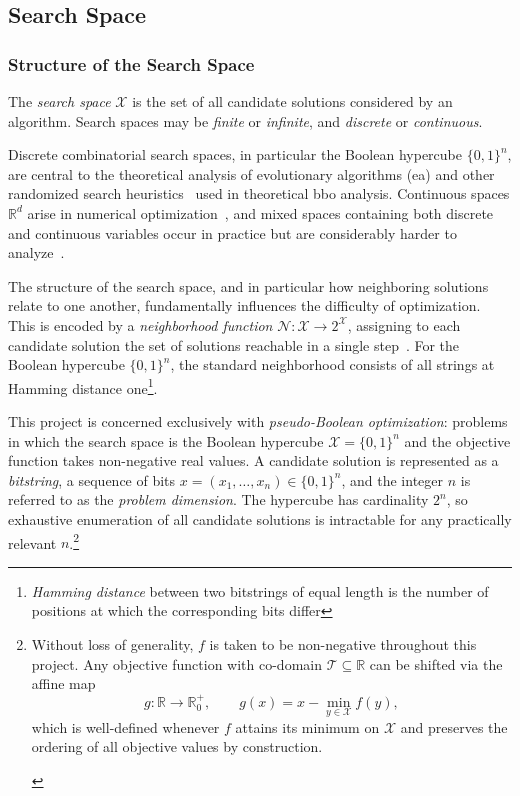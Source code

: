 \subsection{Search Space}
\subsubsection{Structure of the Search Space}

The \textit{search space} $\mathcal{X}$ is the set of all candidate
solutions considered
by an algorithm. Search spaces may be \textit{finite} or \textit{infinite}, and
\textit{discrete} or \textit{continuous}.

Discrete combinatorial search spaces, in particular the Boolean
hypercube $\{0,1\}^n$, are central to the theoretical analysis of
evolutionary algorithms (\acrshort{ea}) and other randomized search
heuristics~\cite{droste2002analysis,hoos2005sls} used in theoretical
\acrshort{bbo} analysis.
Continuous spaces $\mathbb{R}^d$ arise in numerical
optimization~\cite{nocedal2006numerical}, and mixed spaces containing
both discrete and continuous variables occur in practice but are
considerably harder to
analyze~\cite{audet2017derivative}.

The structure of the search space, and in particular how neighboring
solutions relate to
one another, fundamentally influences the difficulty of optimization.
This is encoded by
a \textit{neighborhood function} $\mathcal{N} : \mathcal{X} \to
2^{\mathcal{X}}$,
assigning to each candidate solution the set of solutions reachable
in a single step~\cite{hoos2005intro}.
For the Boolean hypercube $\{0,1\}^n$, the standard neighborhood consists of all
strings at Hamming
distance one\footnote{\textit{Hamming distance} between two
  bitstrings of equal length is the number of positions at which the
corresponding bits differ}.

This project is concerned exclusively with \textit{pseudo-Boolean
optimization}: problems in which the search space is the Boolean hypercube
$\mathcal{X} = \{0,1\}^n$ and the objective function takes non-negative
real values. A candidate solution is represented as a \textit{bitstring},
a sequence of bits $x = (x_1, \ldots, x_n) \in \{0,1\}^n$, and the
integer $n$ is referred to as the \textit{problem dimension}. The
hypercube has cardinality $2^n$, so exhaustive enumeration of all
candidate solutions is intractable for any practically relevant $n$.\footnote{%
  \begin{remark}
    Without loss of generality, $f$ is taken to be non-negative throughout
    this project. Any objective function with co-domain
    $\mathcal{T} \subseteq \mathbb{R}$ can be shifted via the affine map
    \[
      g: \mathbb{R} \to \mathbb{R}_0^+, \qquad g(x) = x - \min_{y \in
      \mathcal{X}} f(y),
    \]
    which is well-defined whenever $f$ attains its minimum on $\mathcal{X}$
    and preserves the ordering of all objective values by construction.
  \end{remark}
}

